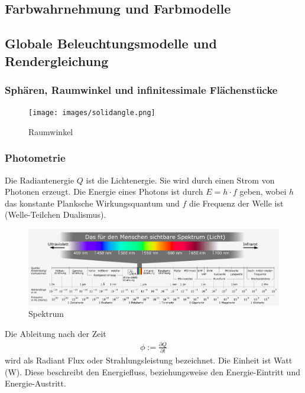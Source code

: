 \subsection{Farbwahrnehmung und Farbmodelle}

\subsection{Globale Beleuchtungsmodelle und Rendergleichung}

\subsubsection{Sphären, Raumwinkel und infinitessimale Flächenstücke}

 \begin{figure}[H]
    \centering
    \texttt{[image: images/solidangle.png]}
    \caption{Raumwinkel}
    \label{fig:cray}
\end{figure}

\subsubsection{Photometrie}

Die Radiantenergie $Q$ ist die Lichtenergie. Sie wird durch einen Strom von Photonen erzeugt. Die Energie eines Photons ist 
durch $E=h \cdot f$ geben, wobei $h$ das konstante Planksche Wirkungsquantum und $f$ die Frequenz der Welle ist (Welle-Teilchen Dualismus).  

 \begin{figure}[H]
    \centering
    \includegraphics[width=1.0\textwidth]{images/Electromagnetic_spectrum_c.png}
    \caption{Spektrum}
    \label{fig:cray}
\end{figure}

\begin{Definition}
Die Ableitung nach der Zeit
\begin{align}
\phi := \frac{\partial Q}{\partial t}
\end{align}
wird als Radiant Flux oder Strahlungsleistung bezeichnet. Die Einheit ist Watt (W).
Diese  beschreibt den Energiefluss, beziehungsweise den Energie-Eintritt und Energie-Austritt.
\end{Definition}

